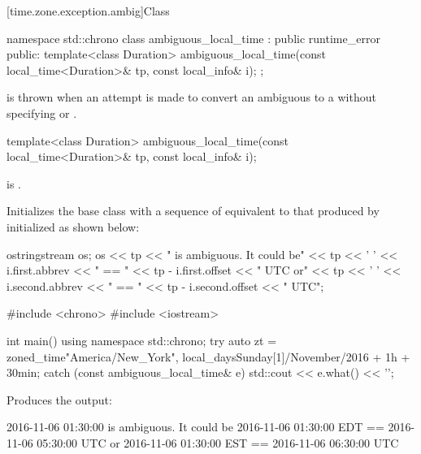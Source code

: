 [time.zone.exception.ambig]{Class }

\begin{codeblock}
namespace std::chrono {
  class ambiguous_local_time : public runtime_error {
  public:
    template<class Duration>
      ambiguous_local_time(const local_time<Duration>& tp, const local_info& i);
  };
}
\end{codeblock}

\pnum
{} is thrown when
an attempt is made
to convert an ambiguous  to a 
without specifying  or .

%
\begin{itemdecl}
template<class Duration>
  ambiguous_local_time(const local_time<Duration>& tp, const local_info& i);
\end{itemdecl}

\begin{itemdescr}
\pnum
\expects
{} is .

\pnum
\effects
Initializes the base class with a sequence of 
equivalent to that produced by 
initialized as shown below:

\begin{codeblock}
ostringstream os;
os << tp << " is ambiguous.  It could be\n"
   << tp << ' ' << i.first.abbrev << " == "
   << tp - i.first.offset << " UTC or\n"
   << tp << ' ' << i.second.abbrev  << " == "
   << tp - i.second.offset  << " UTC";
\end{codeblock}

\pnum
\begin{example}
\begin{codeblock}
#include <chrono>
#include <iostream>

int main() {
  using namespace std::chrono;
  try {
    auto zt = zoned_time{"America/New_York",
                         local_days{Sunday[1]/November/2016} + 1h + 30min};
  } catch (const ambiguous_local_time& e) {
    std::cout << e.what() << '\n';
  }
}
\end{codeblock}

Produces the output:

\begin{outputblock}
2016-11-06 01:30:00 is ambiguous.  It could be
2016-11-06 01:30:00 EDT == 2016-11-06 05:30:00 UTC or
2016-11-06 01:30:00 EST == 2016-11-06 06:30:00 UTC
\end{outputblock}
\end{example}
\end{itemdescr}

